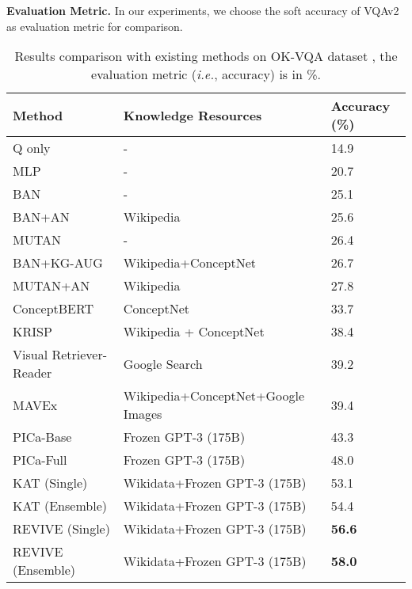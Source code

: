 \documentclass{article}
\begin{document}
\textbf{Evaluation Metric. } In our experiments, we choose the soft accuracy of VQAv2 \cite{antol2015vqa} as evaluation metric for comparison.

\begin{table}
  \caption{Results comparison with existing methods on OK-VQA dataset \cite{marino2019ok}, the evaluation metric (\textit{i.e.}, accuracy) is in \%.}
  \label{sota}
  \centering
  \begin{tabular}{p{4.6cm}<{\centering} | p{6cm}<{\centering} | p{2cm}<{\centering}}
    \toprule
    Method & Knowledge Resources & Accuracy (\%) \\
    \midrule
    Q only \cite{marino2019ok} & - & 14.9 \\
    MLP \cite{marino2019ok} & - & 20.7 \\
    BAN \cite{marino2019ok} & - & 25.1 \\
    BAN+AN \cite{marino2019ok} & Wikipedia & 25.6 \\
    MUTAN \cite{marino2019ok} & - & 26.4 \\
    BAN+KG-AUG \cite{li2020boosting} & Wikipedia+ConceptNet & 26.7 \\
    MUTAN+AN \cite{marino2019ok} & Wikipedia & 27.8 \\
    ConceptBERT \cite{garderes2020conceptbert} & ConceptNet & 33.7 \\
    KRISP \cite{marino2021krisp} & Wikipedia + ConceptNet & 38.4 \\
    Visual Retriever-Reader \cite{luo2021weakly} & Google Search & 39.2 \\
    MAVEx \cite{wu2021multi} & Wikipedia+ConceptNet+Google Images & 39.4 \\
    PICa-Base \cite{yang2021empirical} & Frozen GPT-3 (175B) & 43.3 \\
    PICa-Full \cite{yang2021empirical} & Frozen GPT-3 (175B) & 48.0 \\
    KAT (Single) \cite{gui2021kat} & Wikidata+Frozen GPT-3 (175B) & 53.1 \\ 
    KAT (Ensemble) \cite{gui2021kat} & Wikidata+Frozen GPT-3 (175B) & 54.4 \\ 
    \midrule
    REVIVE (Single) & Wikidata+Frozen GPT-3 (175B) & \textbf{56.6} \\
    REVIVE (Ensemble) & Wikidata+Frozen GPT-3 (175B) & \textbf{58.0} \\
    \bottomrule
  \end{tabular}
  \vspace{-4.5mm}
\end{table}
\end{document}
